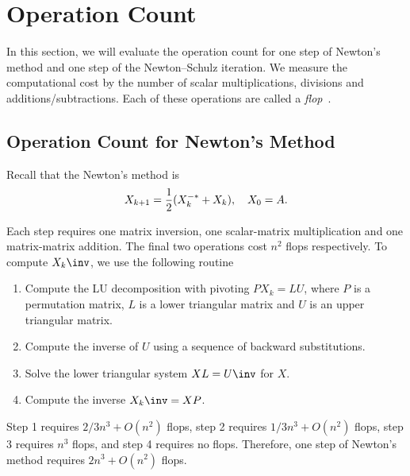 \documentclass{article}
\renewcommand{\emph}[1]{\textit{\color{purple} #1}}
\numberwithin{equation}{section} %
\begin{document}
\section{Operation Count}
In this section, we will evaluate the operation count for one step of
Newton's method and one step of the Newton--Schulz iteration. We measure
the computational cost by the number of scalar multiplications, divisions
and additions/subtractions. Each of these operations are called a
\emph{flop}~.

\subsection{Operation Count for Newton's Method}
Recall that the Newton's method is
\begin{equation}
  \notag 
  X_{k+1} = \frac 12(X_k^{-*} + X_k),\quad X_0 = A.
\end{equation}

Each step requires one matrix inversion, one scalar-matrix multiplication
and one matrix-matrix addition. The final two operations cost $n^2$ flops
respectively. To compute $X_k\inv$, we use the following routine
\begin{enumerate}
\item Compute the LU decomposition with pivoting $PX_k = LU$, where $P$ is
a permutation matrix, $L$ is a lower triangular matrix and $U$ is an upper
triangular matrix.
\item Compute the inverse of $U$ using a sequence of backward
substitutions.
\item Solve the lower triangular system $XL = U\inv$ for $X$.
\item Compute the inverse $X_k\inv = XP$.
\end{enumerate}

Step 1 requires $2/3n^3 + O(n^2)$ flops, step 2 requires $1/3n^3 + O(n^2)$
flops, step 3 requires $n^3$ flops, and step 4 requires no flops.
Therefore, one step of Newton's method requires $2n^3 + O(n^2)$ flops.
\end{document}
